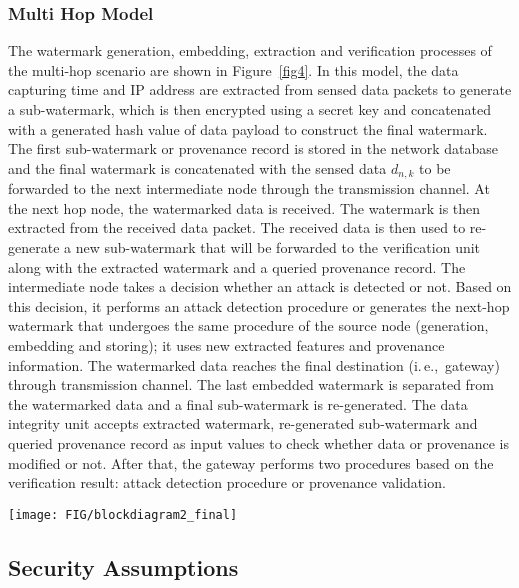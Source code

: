 \documentclass{llncs}
\newcommand{\ie}{i.\,e.,~}
\begin{document}
\subsubsection{Multi Hop Model}
The watermark generation, embedding, extraction and verification processes of the multi-hop scenario are shown in Figure~\ref{fig4}. In this model, the data capturing time and IP address are extracted from sensed data packets to generate a sub-watermark, which is then encrypted using a secret key and concatenated with a generated hash value of data payload to construct the final watermark. The first sub-watermark or provenance record is stored in the network database and the final watermark is concatenated with the sensed data $d_{n,k}$ to be forwarded to the next intermediate node through the transmission channel. At the next hop node, the watermarked data is received. The watermark is then extracted from the received data packet. The received data is then used to re-generate a new sub-watermark that will be forwarded to the verification unit along with the extracted watermark and a queried provenance record. The intermediate node takes a decision whether an attack is detected or not. Based on this decision, it performs an attack detection procedure or generates the next-hop watermark that undergoes the same procedure of the source node (generation, embedding and storing); it uses new extracted features and provenance information. The watermarked data reaches the final destination (\ie gateway) through transmission channel. The last embedded watermark is separated from the watermarked data and a final sub-watermark is re-generated. The data integrity unit accepts extracted watermark, re-generated sub-watermark and queried provenance record as input values to check whether data or provenance is modified or not. After that, the gateway performs two procedures based on the verification result: attack detection procedure or provenance validation. 

\begin{figure*}[t]
\centerline{\texttt{[image: FIG/blockdiagram2\_final]}}
\caption{Zero-watermark generation, storing and verification block diagram in multi-hop scenario.}
\label{fig4}
\end{figure*}

\subsection{Security Assumptions} \label{sec:assumptions}
\end{document}
